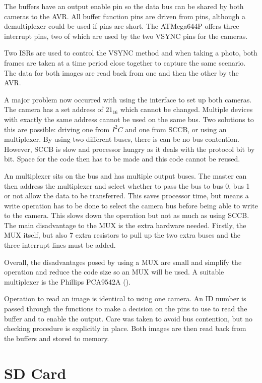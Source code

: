 The buffers have an output enable pin so the data bus can be shared by both cameras to the AVR. All buffer function pins are driven from pins, although a demultiplexer could be used if pins are short. The ATMega644P offers three interrupt pins, two of which are used by the two VSYNC pins for the cameras.

Two ISRs are used to control the VSYNC method and when taking a photo, both frames are taken at a time period close together to capture the same scenario. The data for both images are read back from one and then the other by the AVR. 

A major problem now occurred with using the \itc interface to set up both cameras. The camera has a set \itc address of $21_{16}$ which cannot be changed. Multiple \itc devices with exactly the same address cannot be used on the same bus. 
Two solutions to this are possible: driving one from $I^{2}C$ and one from SCCB, or using an \itc multiplexer. By using two different buses, there is can be no bus contention. However, SCCB is slow and processor hungry as it deals with the protocol bit by bit. Space for the code then has to be made and this code cannot be reused. 

An \itc multiplexer sits on the bus and has multiple output buses. The master can then address the multiplexer and select whether to pass the bus to bus 0, bus 1 or not allow the data to be transferred. This saves processor time, but means a write operation has to be done to select the camera bus before being able to write to the camera. This slows down the operation but not as much as using SCCB. The main disadvantage to the \itc MUX is the extra hardware needed. Firstly, the MUX itself, but also 7 extra resistors to pull up the two extra buses and the three interrupt lines must be added. 

Overall, the disadvantages posed by using a MUX are small and simplify the operation and reduce the code size so an \itc MUX will be used. A suitable multiplexer is the Phillips PCA9542A (\cite{I2C_Mux}).

Operation to read an image is identical to using one camera. An ID number is passed through the functions to make a decision on the pins to use to read the buffer and to enable the output. Care was taken to avoid bus contention, but no checking procedure is explicitly in place. Both images are then read back from the buffers and stored to memory. 

\section{SD Card} \label{sect:SDCard}

